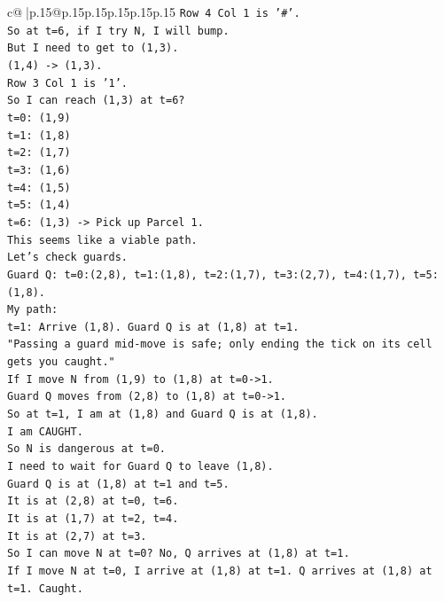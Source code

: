 \documentclass{article}
\begin{document}
{\begin{supertabular}{c@{$\;$}|p{.15\linewidth}@{}p{.15\linewidth}p{.15\linewidth}p{.15\linewidth}p{.15\linewidth}p{.15\linewidth}}
{{{\texttt{Row 4 Col 1 is '\#'.} \\
\texttt{So at t=6, if I try N, I will bump.} \\
\texttt{But I need to get to (1,3).} \\
\texttt{(1,4) {-}> (1,3).} \\
\texttt{Row 3 Col 1 is '1'.} \\
\texttt{So I can reach (1,3) at t=6?} \\
\texttt{t=0: (1,9)} \\
\texttt{t=1: (1,8)} \\
\texttt{t=2: (1,7)} \\
\texttt{t=3: (1,6)} \\
\texttt{t=4: (1,5)} \\
\texttt{t=5: (1,4)} \\
\texttt{t=6: (1,3) {-}> Pick up Parcel 1.} \\
\texttt{This seems like a viable path.} \\
\texttt{Let's check guards.} \\
\texttt{Guard Q: t=0:(2,8), t=1:(1,8), t=2:(1,7), t=3:(2,7), t=4:(1,7), t=5:(1,8).} \\
\texttt{My path:} \\
\texttt{t=1: Arrive (1,8). Guard Q is at (1,8) at t=1.} \\
\texttt{"Passing a guard mid{-}move is safe; only ending the tick on its cell gets you caught."} \\
\texttt{If I move N from (1,9) to (1,8) at t=0{-}>1.} \\
\texttt{Guard Q moves from (2,8) to (1,8) at t=0{-}>1.} \\
\texttt{So at t=1, I am at (1,8) and Guard Q is at (1,8).} \\
\texttt{I am CAUGHT.} \\
\texttt{So N is dangerous at t=0.} \\
\texttt{I need to wait for Guard Q to leave (1,8).} \\
\texttt{Guard Q is at (1,8) at t=1 and t=5.} \\
\texttt{It is at (2,8) at t=0, t=6.} \\
\texttt{It is at (1,7) at t=2, t=4.} \\
\texttt{It is at (2,7) at t=3.} \\
\texttt{So I can move N at t=0? No, Q arrives at (1,8) at t=1.} \\
\texttt{If I move N at t=0, I arrive at (1,8) at t=1. Q arrives at (1,8) at t=1. Caught.} \\
}}}
\end{supertabular}}
\end{document}
